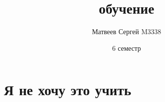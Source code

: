 \documentclass{article}
\title{\hugeМашинное обучение}
\author{Матвеев Сергей M3338}
\date{6 семестр}
\newcommand\0{\mathbb{0}}
\newcommand\1{\mathbb{1}}
\begin{document}
\maketitle

\section{Я не хочу это учить}
\end{document}
